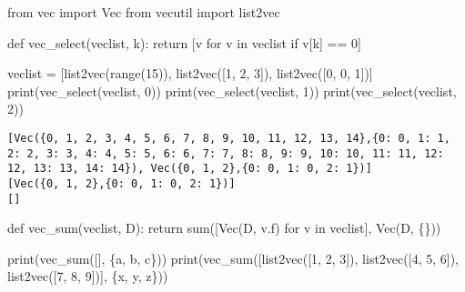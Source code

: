\documentclass[
  letterpaper,
  DIV=11,
  numbers=noendperiod]{scrartcl}
\newenvironment{Shaded}{\begin{snugshade}}{\end{snugshade}}
\newcommand{\BuiltInTok}[1]{\textcolor[rgb]{0.00,0.23,0.31}{#1}}
\newcommand{\ControlFlowTok}[1]{\textcolor[rgb]{0.00,0.23,0.31}{#1}}
\newcommand{\DecValTok}[1]{\textcolor[rgb]{0.68,0.00,0.00}{#1}}
\newcommand{\ImportTok}[1]{\textcolor[rgb]{0.00,0.46,0.62}{#1}}
\newcommand{\KeywordTok}[1]{\textcolor[rgb]{0.00,0.23,0.31}{#1}}
\newcommand{\NormalTok}[1]{\textcolor[rgb]{0.00,0.23,0.31}{#1}}
\newcommand{\OperatorTok}[1]{\textcolor[rgb]{0.37,0.37,0.37}{#1}}
\newcommand{\StringTok}[1]{\textcolor[rgb]{0.13,0.47,0.30}{#1}}
\begin{document}
\newpage{}

\begin{Shaded}
\begin{Highlighting}[numbers=left,,]
\ImportTok{from}\NormalTok{ vec }\ImportTok{import}\NormalTok{ Vec}
\ImportTok{from}\NormalTok{ vecutil }\ImportTok{import}\NormalTok{ list2vec}

\KeywordTok{def}\NormalTok{ vec\_select(veclist, k):}
    \ControlFlowTok{return}\NormalTok{ [v }\ControlFlowTok{for}\NormalTok{ v }\KeywordTok{in}\NormalTok{ veclist }\ControlFlowTok{if}\NormalTok{ v[k] }\OperatorTok{==} \DecValTok{0}\NormalTok{]}

\NormalTok{veclist }\OperatorTok{=}\NormalTok{ [list2vec(}\BuiltInTok{range}\NormalTok{(}\DecValTok{15}\NormalTok{)), list2vec([}\DecValTok{1}\NormalTok{, }\DecValTok{2}\NormalTok{, }\DecValTok{3}\NormalTok{]), list2vec([}\DecValTok{0}\NormalTok{, }\DecValTok{0}\NormalTok{, }\DecValTok{1}\NormalTok{])]}
\BuiltInTok{print}\NormalTok{(vec\_select(veclist, }\DecValTok{0}\NormalTok{))}
\BuiltInTok{print}\NormalTok{(vec\_select(veclist, }\DecValTok{1}\NormalTok{))}
\BuiltInTok{print}\NormalTok{(vec\_select(veclist, }\DecValTok{2}\NormalTok{))}
\end{Highlighting}
\end{Shaded}

\begin{lstlisting}
[Vec({0, 1, 2, 3, 4, 5, 6, 7, 8, 9, 10, 11, 12, 13, 14},{0: 0, 1: 1, 2: 2, 3: 3, 4: 4, 5: 5, 6: 6, 7: 7, 8: 8, 9: 9, 10: 10, 11: 11, 12: 12, 13: 13, 14: 14}), Vec({0, 1, 2},{0: 0, 1: 0, 2: 1})]
[Vec({0, 1, 2},{0: 0, 1: 0, 2: 1})]
[]
\end{lstlisting}

\begin{Shaded}
\begin{Highlighting}[numbers=left,,]
\KeywordTok{def}\NormalTok{ vec\_sum(veclist, D):}
    \ControlFlowTok{return} \BuiltInTok{sum}\NormalTok{([Vec(D, v.f) }\ControlFlowTok{for}\NormalTok{ v }\KeywordTok{in}\NormalTok{ veclist], Vec(D, \{\}))}

\BuiltInTok{print}\NormalTok{(vec\_sum([], \{}\StringTok{\textquotesingle{}a\textquotesingle{}}\NormalTok{, }\StringTok{\textquotesingle{}b\textquotesingle{}}\NormalTok{, }\StringTok{\textquotesingle{}c\textquotesingle{}}\NormalTok{\}))}
\BuiltInTok{print}\NormalTok{(vec\_sum([list2vec([}\DecValTok{1}\NormalTok{, }\DecValTok{2}\NormalTok{, }\DecValTok{3}\NormalTok{]), list2vec([}\DecValTok{4}\NormalTok{, }\DecValTok{5}\NormalTok{, }\DecValTok{6}\NormalTok{]), list2vec([}\DecValTok{7}\NormalTok{, }\DecValTok{8}\NormalTok{, }\DecValTok{9}\NormalTok{])], \{}\StringTok{\textquotesingle{}x\textquotesingle{}}\NormalTok{, }\StringTok{\textquotesingle{}y\textquotesingle{}}\NormalTok{, }\StringTok{\textquotesingle{}z\textquotesingle{}}\NormalTok{\}))}
\end{Highlighting}
\end{Shaded}
\end{document}
